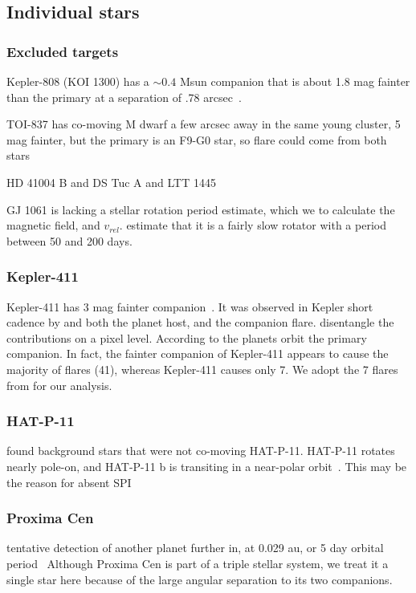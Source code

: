 \documentclass[twocolumn]{aastex631}
\begin{document}
\subsection{Individual stars}
\label{sec:results:individualstars}
\subsubsection{Excluded targets}
Kepler-808 (KOI 1300) has a $\sim0.4$ Msun \cite{kraus2016impact}companion that is about 1.8 mag fainter than the primary at a separation of .78 arcsec~\cite{baranec2016roboao}.

TOI-837 has co-moving M dwarf a few arcsec away in the same young cluster, 5 mag fainter, but the primary is an F9-G0 star, so flare could come from both stars~\cite{bouma2020cluster}

HD 41004 B and DS Tuc A and LTT 1445

GJ 1061 is lacking a stellar rotation period estimate, which we to calculate the magnetic field, and $v_{rel}$. \cite{dreizler2020reddots} estimate that it is a fairly slow rotator with a period between 50 and 200 days.

\subsubsection{Kepler-411}
Kepler-411 has 3 mag fainter companion~\cite{wang2014influence,ziegler2018measuring}. It was observed in Kepler short cadence by \cite{jackman2021stellara} and both the planet host, and the companion flare. \cite{jackman2021stellara} disentangle the contributions on a pixel level. According to \cite{morton2016false, sun2019kepler411} the planets orbit the primary companion. In fact, the fainter companion of Kepler-411 appears to cause the majority of flares (41), whereas Kepler-411 causes only 7. We adopt the 7 flares from \cite{jackman2021stellara} for our analysis.



\subsubsection{HAT-P-11}
\cite{miskovetz2022resolving}  found background stars that were not co-moving HAT-P-11. HAT-P-11 rotates nearly pole-on, and HAT-P-11 b is transiting in a near-polar orbit~\citep{bourrier2023dream}. This may be the reason for absent SPI

\subsubsection{Proxima Cen}
tentative detection of another planet further in, at 0.029 au, or 5 day orbital period~\citep{faria2022candidate, artigau2022linebyline}
Although Proxima Cen is part of a triple stellar system, we treat it a single star here because of the large angular separation to its two companions.
\end{document}
